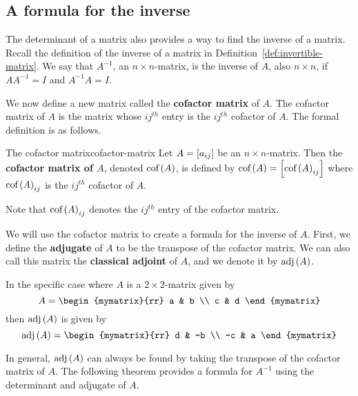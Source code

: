 \subsection{A formula for the inverse}

The determinant of a matrix also provides a way to find the inverse of a matrix.
Recall the definition of the inverse of a matrix in Definition~\ref{def:invertible-matrix}.
We say that $A^{-1}$, an $n \times n$-matrix, is the inverse of $A$, also $n \times n$, if $AA^{-1} = I$ and $A^{-1}A=I$. 

We now define a new matrix called the \textbf{cofactor matrix} of $A$.  
The cofactor matrix of $A$ is the matrix whose $ij^{th}$ entry is the $ij^{th}$ cofactor of $A$.
The formal definition is as follows.

\begin{definition}{The cofactor matrix}{cofactor-matrix}
Let $A=\left[a_{ij}\right]$ be an $n\times n$-matrix. Then the
\textbf{cofactor matrix of $A$}, denoted 
$\mbox{\rm cof}\left(A\right)$, is defined by $\mbox{\rm cof}\left(A\right) =\left[
\mbox{\rm cof}\left(A\right)_{ij}\right] $ where  $\mbox{\rm cof}\left(A\right)_{ij}$ is the $ij^{th}$ cofactor of $A$.
\end{definition}

Note that $\mbox{\rm cof}\left(A\right)_{ij}$ denotes the $ij^{th}$ entry of the cofactor matrix.

We will use the cofactor matrix to create a formula for the inverse of $A$. First,
we define the \textbf{adjugate} of $A$ to be the transpose of 
the cofactor matrix. We can also call this matrix the \textbf{classical adjoint} of $A$,
and we denote it by $\mbox{\rm adj} \left(A\right)$. 

In the specific case where $A$ is a $2 \times 2$-matrix given by
\begin{equation*}
A = \begin{mymatrix}{rr}
a & b \\
c & d
\end{mymatrix}
\end{equation*}
then $\mbox{\rm adj}\left(A\right)$ is given by
\begin{equation*}
\func{adj}\tup{A} = 
\begin{mymatrix}{rr}
d & -b \\
-c & a
\end{mymatrix}
\end{equation*}

In general, $\mbox{\rm adj}\left(A\right)$ can always be found by taking the transpose of the cofactor matrix of $A$. The following theorem provides a formula for $A^{-1}$ using the determinant and adjugate of $A$.

